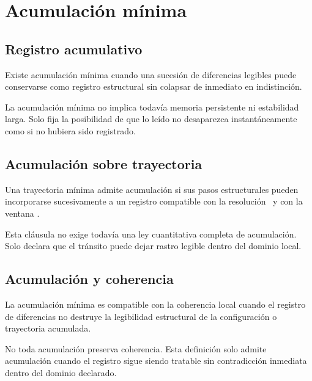\chapter{Acumulación mínima}

\section{Registro acumulativo}
\begin{definition}
Existe acumulación mínima cuando una sucesión de diferencias legibles puede conservarse como registro estructural sin colapsar de inmediato en indistinción.
\end{definition}

\begin{observation}
La acumulación mínima no implica todavía memoria persistente ni estabilidad larga. Solo fija la posibilidad de que lo leído no desaparezca instantáneamente como si no hubiera sido registrado.
\end{observation}

\section{Acumulación sobre trayectoria}
\begin{definition}
Una trayectoria mínima admite acumulación si sus pasos estructurales pueden incorporarse sucesivamente a un registro compatible con la resolución \eps\ y con la ventana \Win.
\end{definition}

\begin{observation}
Esta cláusula no exige todavía una ley cuantitativa completa de acumulación. Solo declara que el tránsito puede dejar rastro legible dentro del dominio local.
\end{observation}

\section{Acumulación y coherencia}
\begin{definition}
La acumulación mínima es compatible con la coherencia local cuando el registro de diferencias no destruye la legibilidad estructural de la configuración o trayectoria acumulada.
\end{definition}

\begin{observation}
No toda acumulación preserva coherencia. Esta definición solo admite acumulación cuando el registro sigue siendo tratable sin contradicción inmediata dentro del dominio declarado.
\end{observation}

